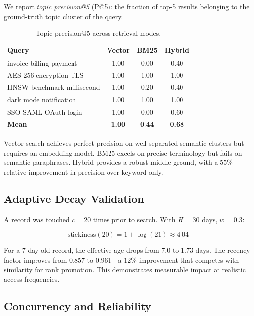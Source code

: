\documentclass[11pt,twocolumn]{article}
\begin{document}
We report \emph{topic precision@5} (P@5): the fraction of top-5 results
belonging to the ground-truth topic cluster of the query.

\begin{table}[h]
\centering
\caption{Topic precision@5 across retrieval modes.}
\label{tab:quality}
\begin{tabular}{lccc}
\toprule
Query & Vector & BM25 & Hybrid \\
\midrule
invoice billing payment & 1.00 & 0.00 & 0.40 \\
AES-256 encryption TLS & 1.00 & 1.00 & 1.00 \\
HNSW benchmark millisecond & 1.00 & 0.20 & 0.40 \\
dark mode notification & 1.00 & 1.00 & 1.00 \\
SSO SAML OAuth login & 1.00 & 0.00 & 0.60 \\
\midrule
\textbf{Mean} & \textbf{1.00} & \textbf{0.44} & \textbf{0.68} \\
\bottomrule
\end{tabular}
\end{table}

Vector search achieves perfect precision on well-separated semantic clusters but
requires an embedding model. BM25 excels on precise terminology but fails on
semantic paraphrases. Hybrid provides a robust middle ground, with a $55\%$
relative improvement in precision over keyword-only.

\subsection{Adaptive Decay Validation}

A record was touched $c=20$ times prior to search. With $H=30$ days, $w=0.3$:

\[
  \text{stickiness}(20) = 1 + \log(21) \approx 4.04
\]

For a 7-day-old record, the effective age drops from $7.0$ to $1.73$ days.
The recency factor improves from $0.857$ to $0.961$---a $12\%$ improvement that
competes with similarity for rank promotion. This demonstrates measurable impact
at realistic access frequencies.

\subsection{Concurrency and Reliability}
\end{document}
